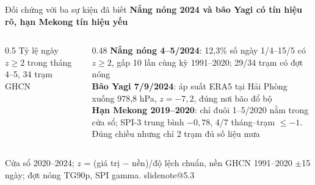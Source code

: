 \documentclass[t,aspectratio=169,12pt]{beamer}
\makeatletter
\newcommand{\slidenote}[1]{\ifcsname slidenote@#1\endcsname\note{\csname slidenote@#1\endcsname}\fi}
\newcommand{\ychinh}[1]{\vskip1mm{\bfseries #1}\par\vskip1mm}
\newcommand{\nguon}[1]{\vskip1mm{\scriptsize\color{mutedgray}#1}}
\makeatother
\begin{document}
\begin{frame}{Đối chứng với ba sự kiện đã biết}
  \ychinh{Nắng nóng 2024 và bão Yagi có tín hiệu rõ, hạn Mekong tín hiệu yếu}
  \begin{columns}[T]
    \begin{column}{0.5\textwidth}
      \centering\scriptsize
      Tỷ lệ ngày $z \ge 2$ trong tháng 4--5, 34 trạm GHCN\\[2pt]
    \end{column}
    \begin{column}{0.48\textwidth}
      \footnotesize
      {\bfseries\color{hustblue}Nắng nóng 4--5/2024}: 12,3\% số ngày 1/4--15/5 có $z \ge 2$, gấp 10 lần cùng kỳ 1991--2020; 29/34 trạm có đợt nóng\\[2mm]
      {\bfseries\color{hustblue}Bão Yagi 7/9/2024}: áp suất ERA5 tại Hải Phòng xuống 978,8 hPa, $z = -7{,}2$, đúng nơi bão đổ bộ\\[2mm]
      {\bfseries\color{hustblue}Hạn Mekong 2019--2020}: chỉ đuôi 1--5/2020 nằm trong cửa sổ; SPI-3 trung bình $-0{,}78$, 4/7 tháng--trạm $\le -1$. Đúng chiều nhưng chỉ 2 trạm đủ số liệu mưa
    \end{column}
  \end{columns}
  \nguon{Cửa sổ 2020--2024; $z$ = (giá trị $-$ nền)/độ lệch chuẩn, nền GHCN 1991--2020 $\pm$15 ngày; đợt nóng TG90p, SPI gamma.}
  \slidenote{5.3}
\end{frame}
\end{document}
